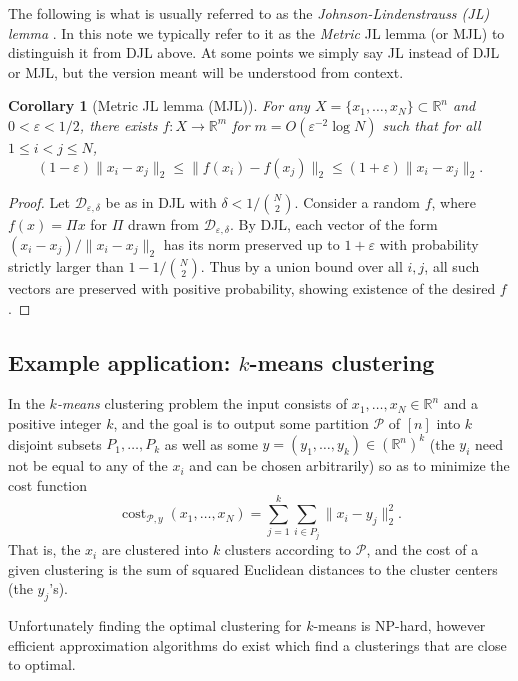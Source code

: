 \documentclass[12pt]{article}
\newcommand{\eps}{\varepsilon}
\newcommand{\R}{\mathbb{R}}
\newtheorem{corollary}{Corollary}
\newcommand{\EquationName}[1]{\label{eq:#1}}
\begin{document}
The following is what is usually referred to as the {\em Johnson-Lindenstrauss (JL) lemma} \cite{JL84}. In this note we typically refer to it as the {\em Metric} JL lemma (or MJL) to distinguish it from DJL above. At some points we simply say JL instead of DJL or MJL, but the version meant will be understood from context.

\begin{corollary}[Metric JL lemma (MJL)]
For any $X = \{x_1,\ldots,x_N\}\subset \R^n$ and $0<\eps<1/2$, there exists $f:X\rightarrow\R^m$ for $m = O(\eps^{-2}\log N)$ such that for all $1\le i < j \le N$,
\begin{equation}
(1-\eps)\|x_i - x_j\|_2 \le \|f(x_i) - f(x_j)\|_2 \le (1+\eps)\|x_i - x_j\|_2 . \EquationName{origjl}
\end{equation}
\end{corollary}
\begin{proof}
Let $\mathcal{D}_{\eps,\delta}$ be as in DJL with $\delta < 1/\binom{N}{2}$. Consider a random $f$, where $f(x) = \Pi x$ for $\Pi$ drawn from $\mathcal{D}_{\eps,\delta}$. By DJL, each vector of the form $(x_i - x_j) / \|x_i - x_j\|_2$ has its norm preserved up to $1+\eps$ with probability strictly larger than $1 - 1/\binom{N}{2}$. Thus by a union bound over all $i, j$, all such vectors are preserved with positive probability, showing existence of the desired $f$.
\end{proof}

\subsection{Example application: $k$-means clustering}

In the {\em $k$-means} clustering problem the input consists of $x_1,\ldots,x_N\in\R^n$ and a positive integer $k$, and the goal is to output some partition $\mathcal{P}$ of $[n]$ into $k$ disjoint subsets $P_1,\ldots,P_k$ as well as some $y = (y_1,\ldots,y_k)\in(\R^n)^k$ (the $y_i$ need not be equal to any of the $x_i$ and can be chosen arbitrarily) so as to minimize the cost function
$$
\mathop{cost}_{\mathcal{P},y}(x_1,\ldots,x_N) = \sum_{j=1}^k \sum_{i\in P_j} \|x_i - y_j\|_2^2 .
$$
That is, the $x_i$ are clustered into $k$ clusters according to $\mathcal{P}$, and the cost of a given clustering is the sum of squared Euclidean distances to the cluster centers (the $y_j$'s).

Unfortunately finding the optimal clustering for $k$-means is NP-hard, however efficient approximation algorithms do exist which find a clusterings that are close to optimal.
\end{document}
